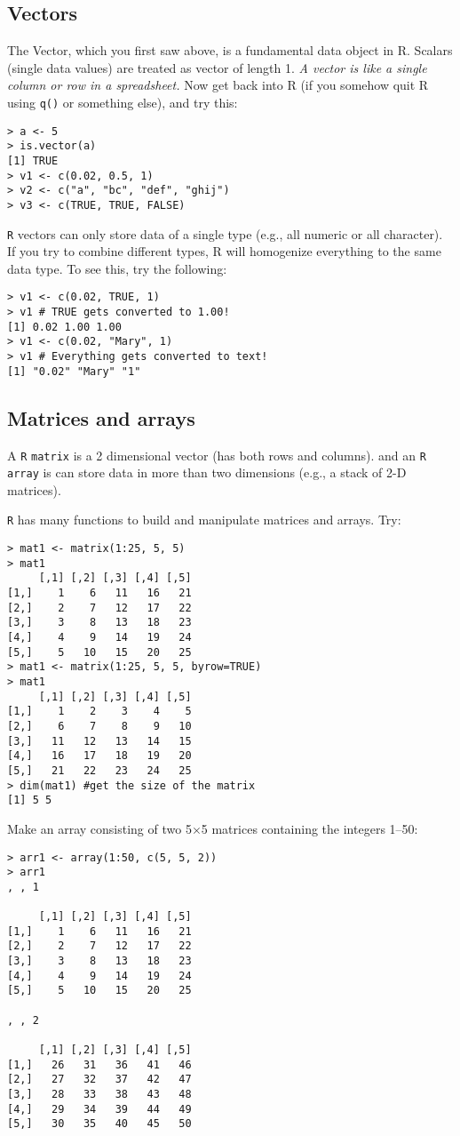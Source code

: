 \subsection{Vectors}
The Vector, which you first saw above, is a fundamental data object in 
R. Scalars (single data values) are treated as vector of length 1. {\it 
A vector is like a single column or row in a spreadsheet.} Now get back 
into R (if you somehow quit R using {\tt q()} or something else), and 
try this:
\begin{lstlisting}
> a <- 5
> is.vector(a)
[1] TRUE
> v1 <- c(0.02, 0.5, 1)
> v2 <- c("a", "bc", "def", "ghij")
> v3 <- c(TRUE, TRUE, FALSE)
\end{lstlisting}
{\tt R} vectors can only store data of a single type (e.g., all numeric 
or all character). If you try to combine different types, R will 
homogenize everything to the same data type. To see this, try the 
following:
\begin{lstlisting}
> v1 <- c(0.02, TRUE, 1)
> v1 # TRUE gets converted to 1.00!
[1] 0.02 1.00 1.00
> v1 <- c(0.02, "Mary", 1)
> v1 # Everything gets converted to text!
[1] "0.02" "Mary" "1"
\end{lstlisting}

\subsection{Matrices and arrays} 

A {\tt R} {\tt matrix} is a 2 dimensional vector (has both rows and columns). 
and an {\tt R array} is can store data in more than two dimensions 
(e.g., a stack of 2-D matrices). 

{\tt R} has many functions to build and manipulate matrices and arrays. 
Try:

\begin{lstlisting}	
> mat1 <- matrix(1:25, 5, 5)
> mat1
	 [,1] [,2] [,3] [,4] [,5]
[1,]    1    6   11   16   21
[2,]    2    7   12   17   22
[3,]    3    8   13   18   23
[4,]    4    9   14   19   24
[5,]    5   10   15   20   25
> mat1 <- matrix(1:25, 5, 5, byrow=TRUE)
> mat1
	 [,1] [,2] [,3] [,4] [,5]
[1,]    1    2    3    4    5
[2,]    6    7    8    9   10
[3,]   11   12   13   14   15
[4,]   16   17   18   19   20
[5,]   21   22   23   24   25
> dim(mat1) #get the size of the matrix
[1] 5 5
\end{lstlisting}

Make an array consisting of two 5$\times$5 matrices containing the 
integers 1--50:
\begin{lstlisting}
> arr1 <- array(1:50, c(5, 5, 2))
> arr1
, , 1

	 [,1] [,2] [,3] [,4] [,5]
[1,]    1    6   11   16   21
[2,]    2    7   12   17   22
[3,]    3    8   13   18   23
[4,]    4    9   14   19   24
[5,]    5   10   15   20   25

, , 2

	 [,1] [,2] [,3] [,4] [,5]
[1,]   26   31   36   41   46
[2,]   27   32   37   42   47
[3,]   28   33   38   43   48
[4,]   29   34   39   44   49
[5,]   30   35   40   45   50
\end{lstlisting}

